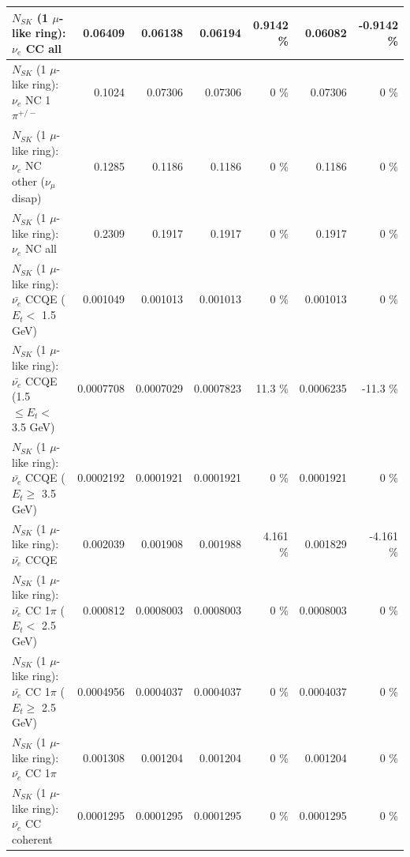 \begin{table}
\begin{tabular}{| l | r | r | r  r | r  r |}
                                  $N_{SK}$ (1 $\mu$-like ring): $\nu_{e}$ CC all &         0.06409 &         0.06138 &         0.06194 &   0.9142 \%  &         0.06082 &  -0.9142 \%  \\ 
\hline
                           $N_{SK}$ (1 $\mu$-like ring): $\nu_e$ NC 1$\pi^{+/-}$ &          0.1024 &         0.07306 &         0.07306 &        0 \%  &         0.07306 &        0 \%  \\ 
                $N_{SK}$ (1 $\mu$-like ring): $\nu_e$ NC other ($\nu_\mu$ disap) &          0.1285 &          0.1186 &          0.1186 &        0 \%  &          0.1186 &        0 \%  \\ 
                                  $N_{SK}$ (1 $\mu$-like ring): $\nu_{e}$ NC all &          0.2309 &          0.1917 &          0.1917 &        0 \%  &          0.1917 &        0 \%  \\ 
\hline
\hline
\hline
            $N_{SK}$ (1 $\mu$-like ring): $\bar{\nu_e}$ CCQE ($E_{t} <$ 1.5 GeV) &        0.001049 &        0.001013 &        0.001013 &        0 \%  &        0.001013 &        0 \%  \\ 
   $N_{SK}$ (1 $\mu$-like ring): $\bar{\nu_e}$ CCQE (1.5 $\leq E_{t} <$ 3.5 GeV) &       0.0007708 &       0.0007029 &       0.0007823 &     11.3 \%  &       0.0006235 &    -11.3 \%  \\ 
         $N_{SK}$ (1 $\mu$-like ring): $\bar{\nu_e}$ CCQE ($E_{t} \geq$ 3.5 GeV) &       0.0002192 &       0.0001921 &       0.0001921 &        0 \%  &       0.0001921 &        0 \%  \\ 
\hline
                                $N_{SK}$ (1 $\mu$-like ring): $\bar{\nu_e}$ CCQE &        0.002039 &        0.001908 &        0.001988 &    4.161 \%  &        0.001829 &   -4.161 \%  \\ 
\hline
       $N_{SK}$ (1 $\mu$-like ring): $\bar{\nu_e}$ CC 1$\pi$ ($E_{t} <$ 2.5 GeV) &        0.000812 &       0.0008003 &       0.0008003 &        0 \%  &       0.0008003 &        0 \%  \\ 
    $N_{SK}$ (1 $\mu$-like ring): $\bar{\nu_e}$ CC 1$\pi$ ($E_{t} \geq$ 2.5 GeV) &       0.0004956 &       0.0004037 &       0.0004037 &        0 \%  &       0.0004037 &        0 \%  \\ 
\hline
                           $N_{SK}$ (1 $\mu$-like ring): $\bar{\nu_e}$ CC 1$\pi$ &        0.001308 &        0.001204 &        0.001204 &        0 \%  &        0.001204 &        0 \%  \\ 
                         $N_{SK}$ (1 $\mu$-like ring): $\bar{\nu_e}$ CC coherent &       0.0001295 &       0.0001295 &       0.0001295 &        0 \%  &       0.0001295 &        0 \%  \\ 

\end{tabular}
\end{table}
